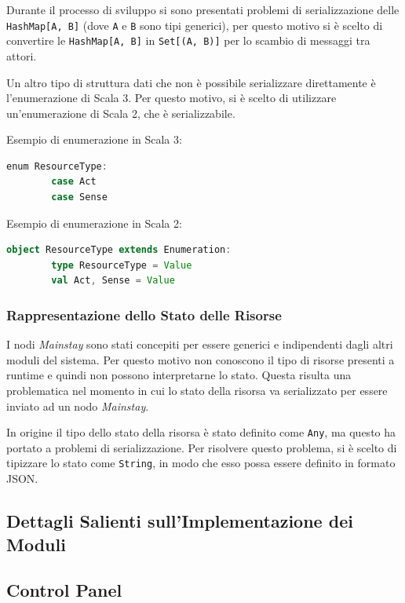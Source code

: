 \documentclass[12pt]{article}
\begin{document}
Durante il processo di sviluppo si sono presentati problemi di serializzazione delle \verb|HashMap[A, B]| (dove \verb|A| e \verb|B| sono tipi generici), per questo motivo si è scelto di convertire le \verb|HashMap[A, B]| in \verb|Set[(A, B)]| per lo scambio di messaggi tra attori.

Un altro tipo di struttura dati che non è possibile serializzare direttamente è l'enumerazione di Scala 3. Per questo motivo, si è scelto di utilizzare un'enumerazione di Scala 2, che è serializzabile.

Esempio di enumerazione in Scala 3:

\begin{lstlisting}[language=Scala]
    enum ResourceType:
        case Act
        case Sense
\end{lstlisting}

Esempio di enumerazione in Scala 2:

\begin{lstlisting}[language=Scala]
    object ResourceType extends Enumeration:
        type ResourceType = Value
        val Act, Sense = Value
\end{lstlisting}

\subsubsection{Rappresentazione dello Stato delle Risorse}

I nodi \textit{Mainstay} sono stati concepiti per essere generici e indipendenti dagli altri moduli del sistema. Per questo motivo non conoscono il tipo di risorse presenti a runtime e quindi non possono interpretarne lo stato. Questa risulta una problematica nel momento in cui lo stato della risorsa va serializzato per essere inviato ad un nodo \textit{Mainstay}.

In origine il tipo dello stato della risorsa è stato definito come \verb|Any|, ma questo ha portato a problemi di serializzazione. Per risolvere questo problema, si è scelto di tipizzare lo stato come \verb|String|, in modo che esso possa essere definito in formato JSON.

\subsection{Dettagli Salienti sull'Implementazione dei Moduli}

\subsection{Control Panel}
\end{document}
